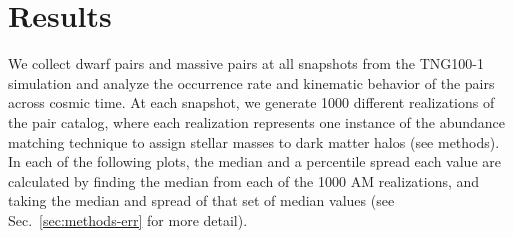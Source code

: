 \documentclass[twocolumn]{aastex631}
\newcommand{\kc}[1]{\textcolor{yellow}{\textbf{kc: #1}} }
\begin{document}








\section{Results}
We collect dwarf pairs and massive pairs at all snapshots from the TNG100-1 simulation and analyze the occurrence rate and kinematic behavior of the pairs across cosmic time. 
At each snapshot, we generate 1000 different realizations of the pair catalog, where each realization represents one instance of the abundance matching technique to assign stellar masses to dark matter halos (see methods). 
In each of the following plots, the median and a percentile spread each value are calculated by finding the median from each of the 1000 AM realizations, and taking the median and spread of that set of median values (see Sec.~\ref{sec:methods-err} for more detail).
\end{document}
